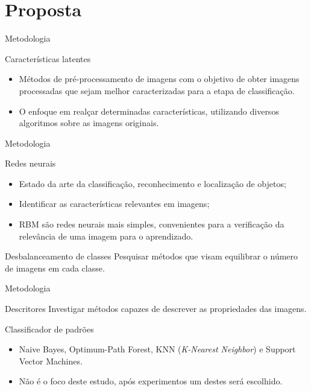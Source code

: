 \documentclass{beamer}
\begin{document}
\section{Proposta}
\begin{frame}{Metodologia}
\setlength\leftmargini{1em}
\begin{block}{Características latentes}
\justifying
\begin{itemize}
\item Métodos de pré-processamento de imagens com o objetivo de obter imagens processadas que sejam melhor caracterizadas para a etapa de classificação. 
\item O enfoque em realçar determinadas características, utilizando diversos algoritmos sobre as imagens originais.
\end{itemize}
\end{block}
\end{frame}
\begin{frame}{Metodologia}
\setlength\leftmargini{1em}
\begin{block}{Redes neurais}
\justifying
\begin{itemize}
\item Estado da arte da classificação, reconhecimento e localização de objetos;
\item Identificar as características relevantes em imagens;
\item RBM são redes neurais mais simples, convenientes para a verificação da relevância de uma imagem para o aprendizado.
\end{itemize}
\end{block}
\begin{block}{Desbalanceamento de classes}
\justifying
Pesquisar métodos que visam equilibrar o número de imagens em cada classe.
\end{block}
\end{frame}
\begin{frame}{Metodologia}
\setlength\leftmargini{1em}
\begin{block}{Descritores}
\justifying
Investigar métodos capazes de descrever as propriedades das imagens.
\end{block}
\begin{block}{Classificador de padrões}
\justifying
\begin{itemize}
\item Naive Bayes, Optimum-Path Forest, KNN (\textit{K-Nearest Neighbor}) e Support Vector Machines. %
\item Não é o foco deste estudo, após experimentos um destes será escolhido.
\end{itemize}
\end{block}
\end{frame}
\end{document}
